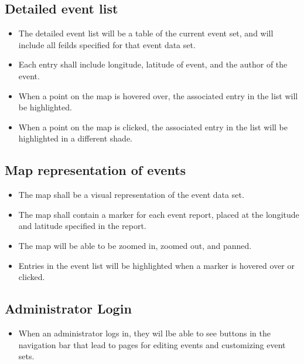 \subsection{Detailed event list}
\begin{itemize}
\item The detailed event list will be a table of the current event set, and will include all feilds specified for that event data set.
\item Each entry shall include longitude, latitude of event, and the author of the event.
\item When a point on the map is hovered over, the associated entry in the list will be highlighted.
\item When a point on the map is clicked, the associated entry in the list will be highlighted in a different shade.
\end{itemize}

\subsection{Map representation of events}
\begin{itemize}
\item The map shall be a visual representation of the event data set. 
\item The map shall contain a marker for each event report, placed at the longitude and latitude specified in the report.
\item The map will be able to be zoomed in, zoomed out, and panned.
\item Entries in the event list will be highlighted when a marker is hovered over or clicked.
\end{itemize}

\subsection{Administrator Login}
\begin{itemize}
\item When an administrator logs in, they wil lbe able to see buttons in the navigation bar that lead to pages for editing events and customizing event sets.
\end{itemize}

